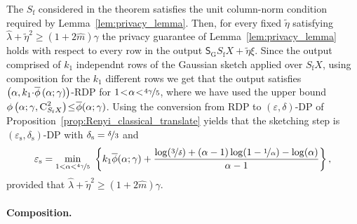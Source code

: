 \documentclass[11pt]{article}
\theoremstyle{definition}
\theoremstyle{plain}
\providecommand{\lemmaref}[1]{Lemma~\ref{#1}}
\providecommand{\propositionref}[1]{Proposition~\ref{#1}}
\newcommand{\reals}{\mathbb{R}}
\newcommand{\eps}{{\varepsilon}}
\newcommand{\pG}{\pazocal{G}}
\newcommand{\pM}{\pazocal{M}}
\renewcommand{\eps}{\varepsilon}
\begin{document}
The $S_{\mathrm{f}}$ considered in the theorem satisfies the unit column-norm condition required by \lemmaref{lem:privacy_lemma}. Then, for every fixed $\widetilde{\eta}$ satisfying $\widehat{\lambda} + \widetilde{\eta}^2 \geq \left(1 + 2\widehat{m}\right)\gamma$ the privacy guarantee of  \lemmaref{lem:privacy_lemma} holds with respect to every row in the output $\mathsf{S}_{\mathrm{G}}S_{\mathrm{f}}X + \widetilde{\eta}\xi$. Since the output comprised of $k_1$ independnt rows of the Gaussian sketch applied over $S_{\mathrm{f}}X$, using composition for the $k_1$ different rows we get that the output satisfies $\left(\alpha, k_1\hspace{-0.2em}\cdot\hspace{-0.2em} \overline{\phi}\left(\alpha; \gamma\right)\right)$-RDP for $1 \hspace{-0.2em}<\hspace{-0.2em} \alpha \hspace{-0.2em}<\hspace{-0.2em} \nicefrac{4\gamma}{5}$, where we have used the upper bound $\phi\left(\alpha; \gamma, \textsc{C}^2_{S_{\mathrm{f}}X}\right) \hspace{-0.2em}\leq\hspace{-0.2em} \overline{\phi}(\alpha; \gamma)$. Using the conversion from RDP to $(\eps, \delta)$-DP of \propositionref{prop:Renyi_classical_translate} yields that the sketching step is $(\eps_{\mathrm{s}}, \delta_{\mathrm{s}})$-DP with $\delta_{\mathrm{s}} = \nicefrac{\delta}{3}$ and 
\begin{align}
    \eps_{\mathrm{s}} = \underset{1 < \alpha < \nicefrac{4\gamma}{5}}{\min} \ \left\{k_1 \overline{\phi}(\alpha; \gamma) + \frac{\log(\nicefrac{3}{\delta}) + (\alpha - 1)\log(1 - \nicefrac{1}{\alpha}) - \log(\alpha)}{\alpha - 1}\right\},
\end{align}
provided that $\widehat{\lambda} + \widetilde{\eta}^2 \geq \left(1 + 2\widehat{m}\right)\gamma$. 


\paragraph{Composition.}\ 
\end{document}
